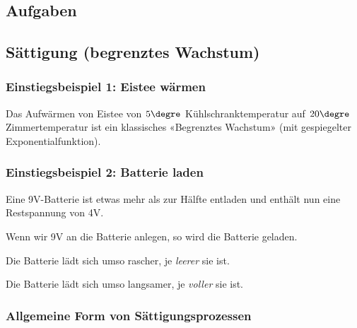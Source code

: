 \subsection*{Aufgaben}

\newpage


\subsection{Sättigung (begrenztes Wachstum)}
\subsubsection{Einstiegsbeispiel 1: Eistee wärmen}
Das Aufwärmen von Eistee von $5\degre$ Kühlschranktemperatur auf $20\degre$ Zimmertemperatur ist ein klassisches «Begrenztes Wachstum» (mit gespiegelter Exponentialfunktion).


\subsubsection{Einstiegsbeispiel 2: Batterie laden}
\begin{center}
\end{center}

Eine 9V-Batterie ist etwas mehr als zur Hälfte entladen und enthält nun eine
Restspannung von 4V.

Wenn wir 9V an die Batterie anlegen, so wird die Batterie geladen.

Die Batterie lädt sich umso rascher, je \textit{leerer} sie ist.

Die Batterie lädt sich umso langsamer, je \textit{voller} sie ist.


\newpage

\subsubsection{Allgemeine Form von Sättigungsprozessen}


